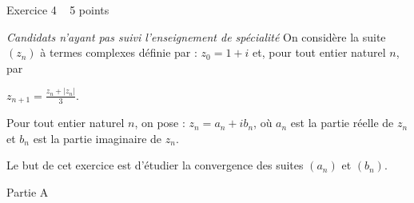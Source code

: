 
%
\begin{h2}Exercice 4   5 points\end{h2}
\textit{Candidats n'ayant pas suivi l'enseignement de spécialité}
On considère la suite $\left(z_{n}\right)$ à termes complexes définie par : $z_{0}=1+i$ et, pour tout entier naturel $n$, par
\begin{center}$z_{n+1}= \frac{z_{n}+|z_{n}|}{3}.$\end{center}
Pour tout entier naturel $n$, on pose : $z_{n}=a_{n}+ib_{n}$, où $a_{n}$ est la partie réelle de $z_{n}$ et $b_{n}$ est la partie imaginaire de $z_{n}$.
\par
Le but de cet exercice est d'étudier la convergence des suites $\left(a_{n}\right)$ et $\left(b_{n}\right)$.
\begin{h3}Partie A\end{h3}
